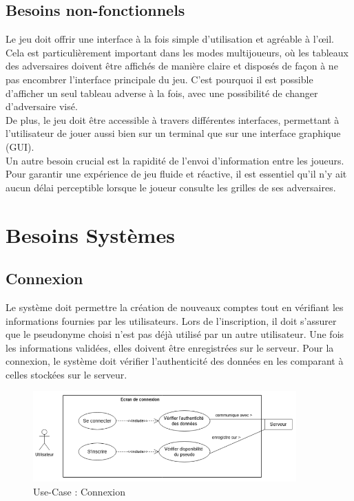 \documentclass{report}
\begin{document}
\section{Besoins non-fonctionnels}

\noindent Le jeu doit offrir une interface à la fois simple d’utilisation et agréable à l’œil. Cela est particulièrement important dans les modes multijoueurs, où les tableaux des adversaires doivent être affichés de manière claire et disposés de façon à ne pas encombrer l’interface principale du jeu. C'est pourquoi il est possible d'afficher un seul tableau adverse à la fois, avec une possibilité de changer d'adversaire visé.\\ 

\noindent De plus, le jeu doit être accessible à travers différentes interfaces, permettant à l’utilisateur de jouer aussi bien sur un terminal que sur une interface graphique (GUI). \\

\noindent Un autre besoin crucial est la rapidité de l’envoi d’information entre les joueurs. Pour garantir une expérience de jeu fluide et réactive, il est essentiel qu’il n’y ait aucun délai perceptible lorsque le joueur consulte les grilles de ses adversaires.



\chapter{Besoins Systèmes}
\label{chap:sys_req}

\section{Connexion}

\noindent Le système doit permettre la création de nouveaux comptes tout en vérifiant les informations fournies par les utilisateurs. Lors de l'inscription, il doit s'assurer que le pseudonyme choisi n'est pas déjà utilisé par un autre utilisateur. Une fois les informations validées, elles doivent être enregistrées sur le serveur. Pour la connexion, le système doit vérifier l'authenticité des données en les comparant à celles stockées sur le serveur.

\vspace{-1em}

\begin{figure}[H]
    \centering
     \includegraphics[width=0.9\textwidth, keepaspectratio]{src/sys_req/connexion.png}
    \caption{Use-Case : Connexion}
    \label{fig:use_case_connexion_sys_req}
\end{figure}
\end{document}
